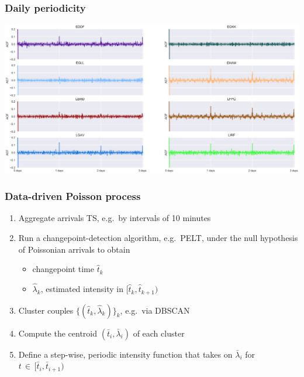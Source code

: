 \documentclass[table,aspectratio=169]{beamer}
\begin{document}
\begin{frame}[t]\frametitle{Daily periodicity}
    \centering
    \includegraphics[width=.8\textwidth]{Autocorr}
\end{frame}

\begin{frame}[t]\frametitle{Data-driven Poisson process}
    \begin{enumerate}
        \item Aggregate arrivals TS, e.g.\ by intervals of 10 minutes
        \item Run a \alert{changepoint-detection} algorithm, e.g.\ PELT, under the null hypothesis of Poissonian arrivals to obtain
        \begin{itemize}
            \item changepoint time $\hat{t}_k$
            \item $\hat{\lambda}_k$, estimated intensity in $[\hat{t}_k, \hat{t}_{k+1})$
        \end{itemize}
        \item \alert{Cluster} couples $\{(\hat{t}_k, \hat{\lambda}_k)\}_k$, e.g.\ via DBSCAN
        \item Compute the \alert{centroid} $(\bar{t}_i, \bar{\lambda}_i)$ of each cluster
        \item Define a \alert{step-wise, periodic intensity function} that takes on $\bar{\lambda}_i$ for $t \,\in\, [\bar{t}_i, \bar{t}_{i+1})$
    \end{enumerate}
\end{frame}
\end{document}
